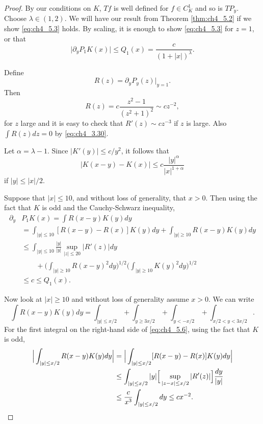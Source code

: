 \begin{proof}
By our conditions on $K$, $Tf$ is well defined for $f \in C_K^1$ and so is $TP_y$. Choose $\lambda \in (1,2)$. We will have our result from Theorem \ref{thm:ch4_5.2} if we show \eqref{eq:ch4_5.3} holds. By scaling, it is enough to show \eqref{eq:ch4_5.3} for $z=1$, or that
\[
    \big|\partial_yP_1K(x)\big| \leq Q_1(x) = \frac{c}{(1+|x|)^\lambda}.
\]

Define
\[
    R(z) = \partial_yP_y(z)|_{y=1}.
\]
Then
\[
    R(z) = c\frac{z^2-1}{(z^2+1)^2} \sim cz^{-2},
\]
for $z$ large and it is easy to check that $R'(z) \sim cz^{-3}$ if $z$ is large. Also $\int R(z)dz = 0$ by \eqref{eq:ch4_3.30}.

Let $\alpha = \lambda - 1$. Since $|K'(y)| \leq c/y^2$, it follows that
\begin{equation}\label{eq:ch4_5.5}
    |K(x-y) - K(x)| \leq c\frac{|y|^\alpha}{|x|^{1+\alpha}}
\end{equation}
if $|y| \leq |x|/2$.

Suppose that $|x| \leq 10$, and without loss of generality, that $x > 0$. Then using the fact that $K$ is odd and the Cauchy-Schwarz inequality,
\begin{align*}
    \partial_y &P_1K(x) = \int R(x-y)K(y)dy \\
    &= \int_{|y|\leq 10} [R(x-y) - R(x)]K(y)dy + \int_{|y|\geq 10} R(x-y)K(y)dy \\
    &\leq \int_{|y|\leq 10} \frac{|y|}{|y|} \sup_{|z|\leq 20} |R'(z)|dy \\
    &\qquad + \Big(\int_{|y|\geq 10} R(x-y)^2dy\Big)^{1/2}\Big(\int_{|y|\geq 10} K(y)^2dy\Big)^{1/2} \\
    &\leq c \leq Q_1(x).
\end{align*}

Now look at $|x| \geq 10$ and without loss of generality assume $x > 0$. We can write
\begin{equation}\label{eq:ch4_5.6}
    \int R(x-y)K(y)dy = \int_{|y|\leq x/2} + \int_{y\geq 3x/2} + \int_{y<-x/2} + \int_{x/2<y<3x/2}.
\end{equation}
For the first integral on the right-hand side of \eqref{eq:ch4_5.6}, using the fact that $K$ is odd,
\begin{align}\label{eq:ch4_5.7}
    \Big|\int_{|y|\leq x/2} R(x-y)K(y)dy\Big| &= \Big|\int_{|y|\leq x/2} [R(x-y) - R(x)]K(y)dy\Big| \\
    &\leq \int_{|y|\leq x/2} |y|\Big[\sup_{|z-x|\leq x/2} |R'(z)|\Big]\frac{dy}{|y|} \notag \\
    &\leq \frac{c}{x^3} \int_{|y|\leq x/2} dy \leq cx^{-2}. \notag
\end{align}


\end{proof}
